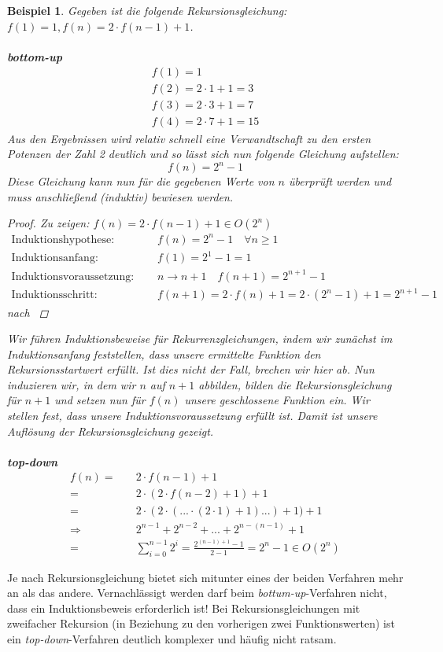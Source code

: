 \documentclass[11pt,a4paper]{scrartcl}
\newtheorem{example}{Beispiel}
\begin{document}
\begin{example}
Gegeben ist die folgende Rekursionsgleichung: $f(1) = 1, f(n) = 2 \cdot f(n-1) + 1$. \\\\
\textbf{bottom-up} \\
\begin{align}
f(1) = 1 \\
f(2) = 2 \cdot 1 + 1 = 3 \\
f(3) = 2 \cdot 3 + 1 = 7 \\
f(4) = 2 \cdot 7 + 1 = 15
\end{align}
Aus den Ergebnissen wird relativ schnell eine Verwandtschaft zu den ersten Potenzen der Zahl 2 deutlich und so lässt sich nun folgende Gleichung aufstellen: 
\[f(n) = 2^{n} - 1\]
Diese Gleichung kann nun für die gegebenen Werte von $n$ überprüft werden und muss anschließend (induktiv) bewiesen werden. \\
\begin{proof}
Zu zeigen: $f(n) = 2 \cdot f(n-1) + 1 \in O(2^{n})$ \\
\begin{align*}
\text{Induktionshypothese: }& \quad f(n) = 2^{n} - 1 \quad \forall n \geq 1 \\
\text{Induktionsanfang: }& \quad f(1) = 2^{1} - 1 = 1 \\
\text{Induktionsvoraussetzung: }& \quad n \to n + 1 \quad f(n+1) = 2^{n+1} -1\\
\text{Induktionsschritt: }& \quad f(n+1) = 2 \cdot f(n) + 1 = 2 \cdot (2^{n} - 1) + 1 = 2^{n+1} - 1
\end{align*}
nach \parencite{UniHH}
\end{proof}
Wir führen Induktionsbeweise für Rekurrenzgleichungen, indem wir zunächst im Induktionsanfang feststellen, dass unsere ermittelte Funktion den Rekursionsstartwert erfüllt. Ist dies nicht der Fall, brechen wir hier ab. Nun induzieren wir, in dem wir $n$ auf $n+1$ abbilden, bilden die Rekursionsgleichung für $n+1$ und setzen nun für $f(n)$ unsere geschlossene Funktion ein. Wir stellen fest, dass unsere Induktionsvoraussetzung erfüllt ist. Damit ist unsere Auflösung der Rekursionsgleichung gezeigt.\\\\
\textbf{top-down} \\
\begin{align}
f(n) =& \quad 2 \cdot f(n-1) + 1 \\
=& \quad 2 \cdot (2 \cdot f(n-2) + 1) + 1 \\
=& \quad 2 \cdot (2 \cdot (... \cdot (2 \cdot 1) + 1) ... ) + 1) + 1 \\
\Rightarrow & \quad 2^{n-1} + 2^{n-2} + ... + 2^{n-(n-1)} + 1 \\
=& \quad \sum_{i = 0}^{n-1} 2^{i} = \frac{2^{(n-1)+1}-1}{2-1} = 2^{n}-1 \in O(2^{n}) 
\end{align}
\end{example}
Je nach Rekursionsgleichung bietet sich mitunter eines der beiden Verfahren mehr an als das andere. Vernachlässigt werden darf beim \textit{bottum-up}-Verfahren nicht, dass ein Induktionsbeweis erforderlich ist! Bei Rekursionsgleichungen mit zweifacher Rekursion (in Beziehung zu den vorherigen zwei Funktionswerten) ist ein \textit{top-down}-Verfahren deutlich komplexer und häufig nicht ratsam.
\pagebreak
\end{document}
